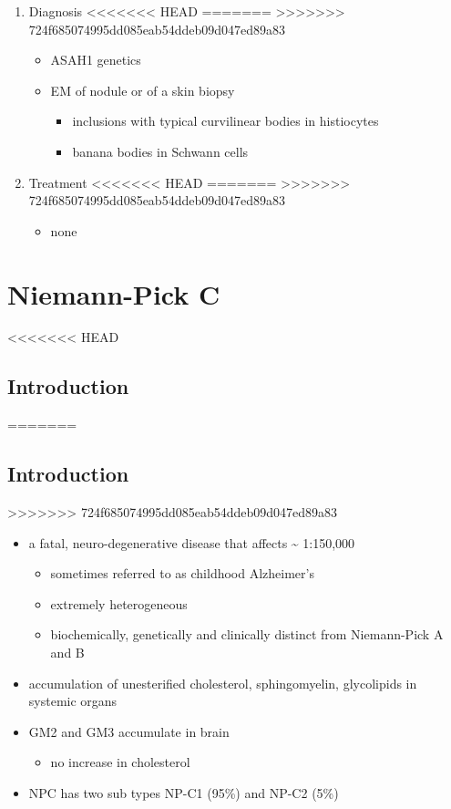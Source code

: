 \documentclass[fontsize=12pt]{scrartcl}
\begin{document}
\begin{enumerate}
\begin{enumerate}
\begin{enumerate}
\begin{enumerate}
\begin{table}[htbp]
\begin{enumerate}
\begin{enumerate}
\begin{enumerate}
\item Diagnosis
<<<<<<< HEAD
\label{sec:org2b641d6}
=======
\label{sec:orgd8a5b40}
>>>>>>> 724f685074995dd085eab54ddeb09d047ed89a83
\begin{itemize}
\item ASAH1 genetics
\item EM of nodule or of a skin biopsy
\begin{itemize}
\item inclusions with typical curvilinear bodies in histiocytes
\item banana bodies in Schwann cells
\end{itemize}
\end{itemize}

\item Treatment
<<<<<<< HEAD
\label{sec:org0136b7d}
=======
\label{sec:orga4ad726}
>>>>>>> 724f685074995dd085eab54ddeb09d047ed89a83
\begin{itemize}
\item none
\end{itemize}
\end{enumerate}
\section{Niemann-Pick C}
<<<<<<< HEAD
\label{sec:org7a74184}
\subsection{Introduction}
\label{sec:orgf87c037}
=======
\label{sec:orgdd340c6}
\subsection{Introduction}
\label{sec:orgcf13b28}
>>>>>>> 724f685074995dd085eab54ddeb09d047ed89a83
\begin{itemize}
\item a fatal, neuro-degenerative disease that affects \textasciitilde{} 1:150,000
\begin{itemize}
\item sometimes referred to as childhood Alzheimer’s
\item extremely heterogeneous
\item biochemically, genetically and clinically distinct from Niemann-Pick A and B
\end{itemize}
\item accumulation of unesterified cholesterol, sphingomyelin, glycolipids in systemic organs
\item GM2 and GM3 accumulate in brain
\begin{itemize}
\item no increase in cholesterol
\end{itemize}
\item NPC has two sub types NP-C1 (95\%) and NP-C2 (5\%)


\end{itemize}
\end{enumerate}
\end{enumerate}
\end{table}
\end{enumerate}
\end{enumerate}
\end{enumerate}
\end{enumerate}
\end{document}
